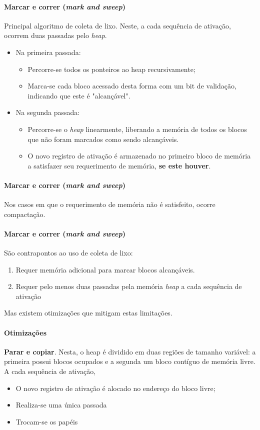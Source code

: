 \documentclass{beamer}
\newcommand{\slide}[2]{
	\begin{frame}{\insertsection}
		\framesubtitle{#1}
		#2
	\end{frame}
}
\begin{document}
\slide{Marcar e correr (\textit{mark and sweep})}{
	Principal algoritmo de coleta de lixo. \pause Neste, a cada sequência de ativação, ocorrem duas passadas pelo \textit{heap}.

	\begin{itemize}
		\item Na primeira passada:
		      \pause
		      \begin{itemize}
			      \item Percorre-se todos os ponteiros ao heap recursivamente;
			            \pause
			      \item Marca-se cada bloco acessado desta forma com um bit de validação, indicando que este é "alcançável".
		      \end{itemize}
		\item Na segunda passada:
		      \pause
		      \begin{itemize}
			      \item Percorre-se o \textit{heap} linearmente, liberando a memória de todos os blocos que não foram marcados como sendo alcançáveis.
			            \pause

			      \item O novo registro de ativação é armazenado no primeiro
			            bloco de memória a satisfazer seu requerimento de memória,
			            \textbf{se este houver}.

		      \end{itemize}
	\end{itemize}
}

\slide{Marcar e correr (\textit{mark and sweep})}{
	Nos casos em que o requerimento de memória não é satisfeito, ocorre
	compactação.
}

\slide{Marcar e correr (\textit{mark and sweep})}{
	São contrapontos ao uso de coleta de lixo:
	\pause
	\begin{enumerate}
		\item Requer memória adicional para marcar blocos alcançáveis.
		      \pause
		\item Requer pelo menos duas passadas pela memória \textit{heap} a cada sequência de
		      ativação
	\end{enumerate}
	\pause
	Mas existem otimizações que mitigam estas limitações.
}

\slide{Otimizações}{
	\textbf{Parar e copiar}. Nesta, o heap é dividido em duas regiões de tamanho
	variável: \pause a primeira possui blocos ocupados e a segunda um
	bloco contíguo de memória livre. \pause A cada sequência de ativação,

	\begin{itemize}
		\item O novo registro de ativação é alocado no endereço do bloco livre;
		      \pause
		\item Realiza-se uma única passada
		      \pause
		\item Trocam-se os papéis
	\end{itemize}
}
\end{document}

